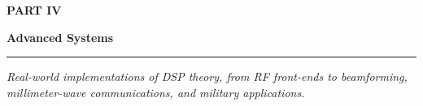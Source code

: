 
\cleardoublepage
\thispagestyle{empty}  %

\vspace*{40pt}  %

\begin{center}

{\sffamily\bfseries\fontsize{60}{68}\selectfont PART IV}

\vspace{30pt}

{\sffamily\bfseries\fontsize{48}{56}\selectfont Advanced Systems}

\vspace{20pt}

\rule{0.5\textwidth}{0.4pt}  %

\vspace{20pt}

{\itshape\large
Real-world implementations of DSP theory, from RF front-ends to beamforming,\\
millimeter-wave communications, and military applications.
}

\end{center}

\vspace{80pt}  %

\clearpage
